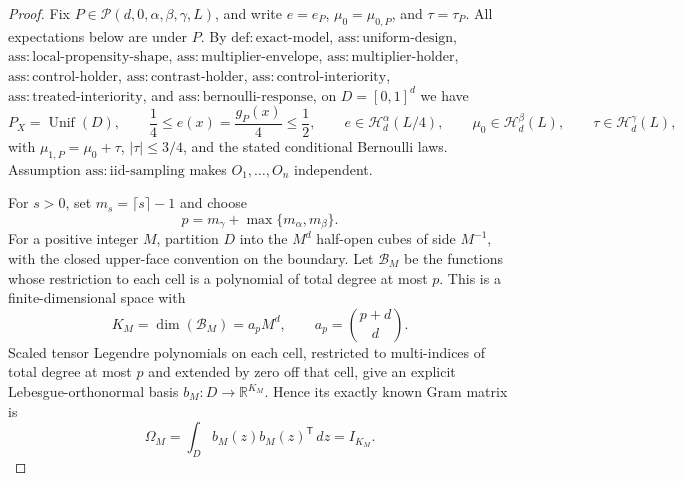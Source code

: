\documentclass{article}
\begin{document}
\begin{proof}
Fix \(P\in\mathcal P(d,0,\alpha,\beta,\gamma,L)\), and write \(e=e_P\), \(\mu_0=\mu_{0,P}\), and \(\tau=\tau_P\).  All expectations below are under \(P\).  By \(\mathrm{def:exact\mbox{-}model}\), \(\mathrm{ass:uniform\mbox{-}design}\), \(\mathrm{ass:local\mbox{-}propensity\mbox{-}shape}\), \(\mathrm{ass:multiplier\mbox{-}envelope}\), \(\mathrm{ass:multiplier\mbox{-}holder}\), \(\mathrm{ass:control\mbox{-}holder}\), \(\mathrm{ass:contrast\mbox{-}holder}\), \(\mathrm{ass:control\mbox{-}interiority}\), \(\mathrm{ass:treated\mbox{-}interiority}\), and \(\mathrm{ass:bernoulli\mbox{-}response}\), on \(D=[0,1]^d\) we have
\[
 P_X=\operatorname{Unif}(D),\qquad
 \frac14\leq e(x)=\frac{g_P(x)}4\leq\frac12,
 \qquad e\in\mathcal H_d^\alpha(L/4),
 \qquad \mu_0\in\mathcal H_d^\beta(L),
 \qquad \tau\in\mathcal H_d^\gamma(L),
 \tag{1}
\]
with \(\mu_{1,P}=\mu_0+\tau\), \(|\tau|\leq3/4\), and the stated conditional Bernoulli laws.  Assumption \(\mathrm{ass:iid\mbox{-}sampling}\) makes \(O_1,\ldots,O_n\) independent.

For \(s>0\), set \(m_s=\lceil s\rceil-1\) and choose
\[
 p=m_\gamma+\max\{m_\alpha,m_\beta\}.
\]
For a positive integer \(M\), partition \(D\) into the \(M^d\) half-open cubes of side \(M^{-1}\), with the closed upper-face convention on the boundary.  Let \(\mathcal B_M\) be the functions whose restriction to each cell is a polynomial of total degree at most \(p\).  This is a finite-dimensional space with
\[
 K_M=\dim(\mathcal B_M)=a_pM^d,
 \qquad a_p=\binom{p+d}{d}.
 \tag{2}
\]
Scaled tensor Legendre polynomials on each cell, restricted to multi-indices of total degree at most \(p\) and extended by zero off that cell, give an explicit Lebesgue-orthonormal basis \(b_M:D\to\mathbb R^{K_M}\).  Hence its exactly known Gram matrix is
\[
 \Omega_M=\int_D b_M(z)b_M(z)^{\mathsf T}\,dz=I_{K_M}.
 \tag{3}
\]


\end{proof}
\end{document}
